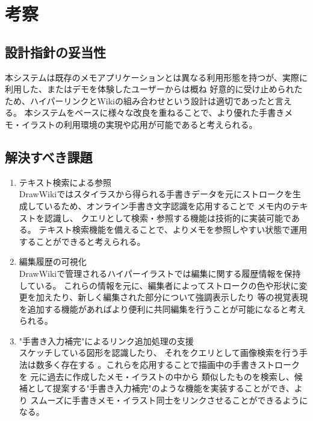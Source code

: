 \section{考察}

\subsection{設計指針の妥当性}
本システムは既存のメモアプリケーションとは異なる利用形態を持つが、実際に利用した、またはデモを体験したユーザーからは概ね
好意的に受け止められたため、ハイパーリンクとWikiの組み合わせという設計は適切であったと言える。
本システムをベースに様々な改良を重ねることで、より優れた手書きメモ・イラストの利用環境の実現や応用が可能であると考えられる。

\subsection{解決すべき課題}
\begin{enumerate}
    \item テキスト検索による参照\\
    DrawWikiではスタイラスから得られる手書きデータを元にストロークを生成しているため、オンライン手書き文字認識を応用することで
    メモ内のテキストを認識し、 クエリとして検索・参照する機能は技術的に実装可能である。
    テキスト検索機能を備えることで、よりメモを参照しやすい状態で運用することができると考えられる。
    \item 編集履歴の可視化\\
    DrawWikiで管理されるハイパーイラストでは編集に関する履歴情報を保持している。
    これらの情報を元に、編集者によってストロークの色や形状に変更を加えたり、新しく編集された部分について強調表示したり
    等の視覚表現を追加する機能があればより便利に共同編集を行うことが可能になると考えられる。
    \item "手書き入力補完"によるリンク追加処理の支援\\
    スケッチしている図形を認識したり\cite{Notowidigdo2004OfflineSI}\cite{Wobbrock2007GesturesWL}、
    それをクエリとして画像検索を行う手法は数多く存在する\cite{Eitz2012SketchbasedSR}\cite{Eitz2011PhotosketcherIS}
    \cite{Chen2009Sketch2PhotoII}。これらを応用することで描画中の手書きストロークを 元に過去に作成したメモ・イラストの中から
    類似したものを検索し、候補として提案する"手書き入力補完"のような機能を実装することができ、より
    スムーズに手書きメモ・イラスト同士をリンクさせることができるようになる。
\end{enumerate}

